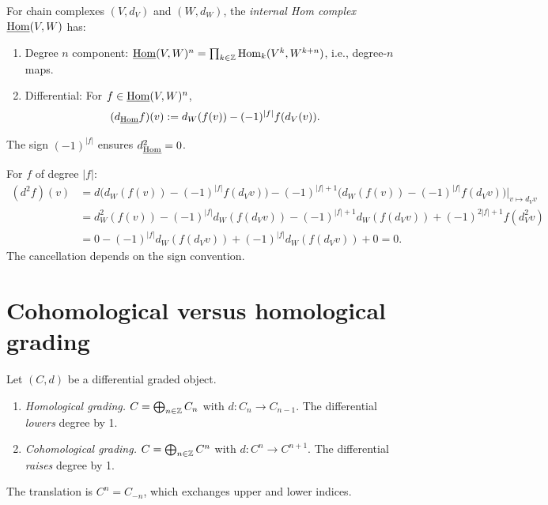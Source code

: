 \begin{definition}
\label{def:graded-hom}
For chain complexes $(V, d_V)$ and $(W, d_W)$, the \emph{internal Hom complex} 
$\underline{\operatorname{Hom}}(V, W)$ has:
\begin{enumerate}[label=(\roman*)]
\item Degree $n$ component: $\underline{\operatorname{Hom}}(V, W)^n = \prod_{k \in \mathbb{Z}} 
\operatorname{Hom}_k(V^k, W^{k+n})$, i.e., degree-$n$ maps.
\item Differential: For $f \in \underline{\operatorname{Hom}}(V, W)^n$,
\[
(d_{\underline{\operatorname{Hom}}} f)(v) := d_W(f(v)) - (-1)^{|f|} f(d_V(v)).
\]
\end{enumerate}
The sign $(-1)^{|f|}$ ensures $d_{\underline{\Hom}}^2 = 0$.
\end{definition}

\begin{verification}[\texorpdfstring{$d_{\underline{\Hom}}^2 = 0$}{d\_Hom\textasciicircum 2 = 0}]
\label{ver:d-hom-squared}
For $f$ of degree $|f|$:
\begin{align*}
(d^2 f)(v) &= d\bigl( d_W(f(v)) - (-1)^{|f|} f(d_V v) \bigr) 
             - (-1)^{|f|+1} \bigl( d_W(f(v)) - (-1)^{|f|} f(d_V v) \bigr)|_{v \mapsto d_V v} \\
&= d_W^2(f(v)) - (-1)^{|f|} d_W(f(d_V v)) 
   - (-1)^{|f|+1} d_W(f(d_V v)) + (-1)^{2|f|+1} f(d_V^2 v) \\
&= 0 - (-1)^{|f|} d_W(f(d_V v)) + (-1)^{|f|} d_W(f(d_V v)) + 0 = 0.
\end{align*}
The cancellation depends on the sign convention.
\end{verification}


\section{Cohomological versus homological grading}
\label{sec:cohom-vs-homol}


\begin{definition}
\label{def:grading-conventions}
Let $(C, d)$ be a differential graded object.
\begin{enumerate}[label=(\roman*)]
\item \emph{Homological grading.} $C = \bigoplus_{n \in \mathbb{Z}} C_n$ with
$d: C_n \to C_{n-1}$. The differential \emph{lowers} degree by 1.
\item \emph{Cohomological grading.} $C = \bigoplus_{n \in \mathbb{Z}} C^n$ with
$d: C^n \to C^{n+1}$. The differential \emph{raises} degree by 1.
\end{enumerate}
The translation is $C^n = C_{-n}$, which exchanges upper and lower indices.
\end{definition}

